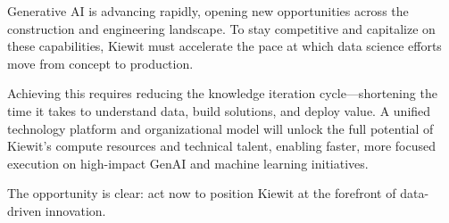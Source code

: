 \documentclass{article}
\begin{document}
Generative AI is advancing rapidly, opening new opportunities across the construction and engineering landscape. To stay competitive and capitalize on these capabilities, Kiewit must accelerate the pace at which data science efforts move from concept to production.

Achieving this requires reducing the knowledge iteration cycle—shortening the time it takes to understand data, build solutions, and deploy value. A unified technology platform and organizational model will unlock the full potential of Kiewit's compute resources and technical talent, enabling faster, more focused execution on high-impact GenAI and machine learning initiatives.

The opportunity is clear: act now to position Kiewit at the forefront of data-driven innovation.

\printbibliography
\end{document}
